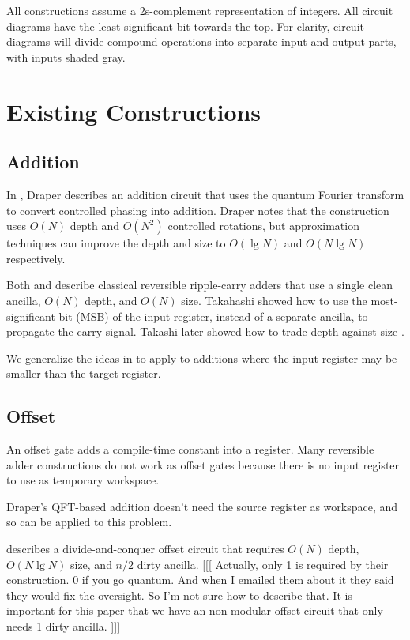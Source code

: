 \documentclass[twocolumn]{article}
\begin{document}
All constructions assume a 2s-complement representation of integers.
All circuit diagrams have the least significant bit towards the top.
For clarity, circuit diagrams will divide compound operations into separate input and output parts, with inputs shaded gray.

\section{Existing Constructions} \label{sec:review}

\subsection{Addition}

In \cite{draper2000}, Draper describes an addition circuit that uses the quantum Fourier transform to convert controlled phasing into addition.
Draper notes that the construction uses $O(N)$ depth and $O(N^2)$ controlled rotations, but approximation techniques \cite{barenco1996} \cite{cleve2000} can improve the depth and size to $O(\lg N)$ and $O(N \lg N)$ respectively.

Both \cite{cuccaro2004} and \cite{van2004} describe classical reversible ripple-carry adders that use a single clean ancilla, $O(N)$ depth, and $O(N)$ size.
Takahashi \cite{takahashi2005} showed how to use the most-significant-bit (MSB) of the input register, instead of a separate ancilla, to propagate the carry signal.
Takashi later showed how to trade depth against size \cite{takahashi2009}.

We generalize the ideas in \cite{takahashi2005} to apply to additions where the input register may be smaller than the target register.

\subsection{Offset}

An offset gate adds a compile-time constant into a register.
Many reversible adder constructions do not work as offset gates because there is no input register to use as temporary workspace.

Draper's QFT-based addition \cite{draper2000} doesn't need the source register as workspace, and so can be applied to this problem.

\cite{haner2016} describes a divide-and-conquer offset circuit that requires $O(N)$ depth, $O(N \lg N)$ size, and $n/2$ dirty ancilla.
[[[ Actually, only 1 is required by their construction. 0 if you go quantum. And when I emailed them about it they said they would fix the oversight. So I'm not sure how to describe that. It is important for this paper that we have an non-modular offset circuit that only needs 1 dirty ancilla. ]]]
\end{document}
